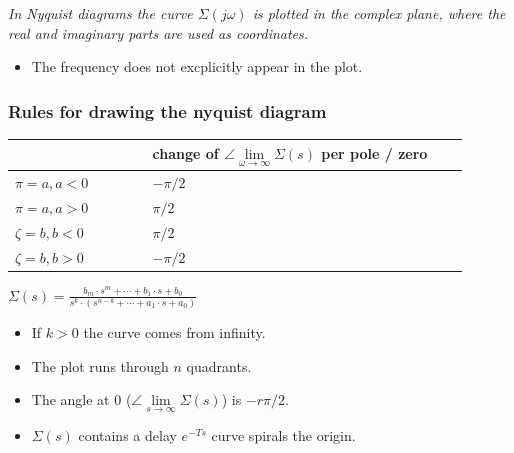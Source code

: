 \documentclass[10pt,a4paper]{scrartcl}
\begin{document}
\begin{multicols*}{3}
	\emph{In Nyquist diagrams the curve $\Sigma(j\omega)$ is plotted in the complex plane, where the real and imaginary parts are used as coordinates.}
	
	\begin{itemize}
	\compaq
	\item
	The frequency does not excplicitly appear in the plot.
	\end{itemize}
	
	
	
	
	\subsubsection{Rules for drawing the nyquist diagram}
	
	\begin{tabular}{p{0.275\linewidth}|p{0.625\linewidth}}
	&change of $\angle\lim\limits_{\omega\rightarrow\infty}{\Sigma(s)}$ per pole / zero\\
	\hline
	$\pi=a,a<0$&$-\pi/2$\\
	$\pi=a,a>0$&$\pi/2$\\
	\hline
	$\zeta=b,b<0$&$\pi/2$\\
	$\zeta=b,b>0$&$-\pi/2$\\
	\hline
	\end{tabular}
	
	\begin{center}
	\large
	$\Sigma(s)=\frac{b_m\cdot s^m+\cdots +b_1\cdot s + b_0}{s^k\cdot(s^{n-k}+\cdots+a_1\cdot s+a_0)}$
	\normalsize
	\end{center}
	
	
	\begin{itemize}
	\compaq
	\item
	If $k>0$ the curve comes from infinity.
	\item
	The plot runs through $n$ quadrants.
	\item
	The angle at 0 ($\angle\lim\limits_{s\rightarrow\infty}{\Sigma(s)}$) is $-r\pi/2$.
	\item
	$\Sigma(s)$ contains a delay $e^{-Ts}$ \dahe curve spirals the origin.
	\end{itemize}
	
	
	

\end{multicols*}
\end{document}
